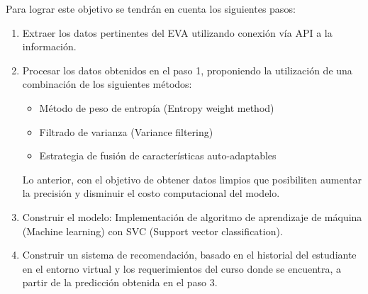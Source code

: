 Para lograr este objetivo se tendrán en cuenta los siguientes pasos:
\begin{enumerate}
    \item Extraer los datos pertinentes del EVA utilizando conexión vía API a la información.
    \item Procesar los datos obtenidos en el paso 1, proponiendo la utilización de una combinación de los siguientes métodos:
    \begin{itemize}
        \item Método de peso de entropía (Entropy weight method)
        \item Filtrado de varianza (Variance filtering)
        \item Estrategia de fusión de características auto-adaptables
    \end{itemize}
        Lo anterior, con el objetivo de obtener datos limpios que posibiliten aumentar la precisión y disminuir el costo computacional del modelo.
    \item Construir el modelo: Implementación de algoritmo de aprendizaje de máquina (Machine learning) con SVC (Support vector classification).
    \item Construir un sistema de recomendación, basado en el historial del estudiante en el entorno virtual y los requerimientos del curso donde se encuentra, a partir de la predicción obtenida en el paso 3.
\end{enumerate}
